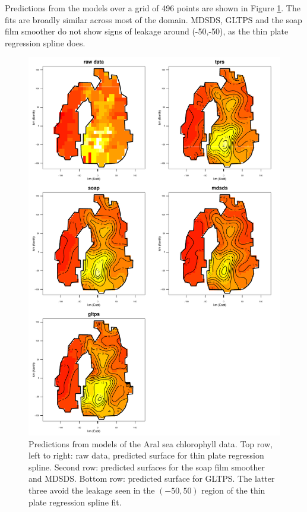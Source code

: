 \documentclass[smallextended]{svjour3}       %
\begin{document}
Predictions from the models over a grid of 496 points are shown in Figure \ref{aral-plot}. The fits are broadly similar across most of the domain. MDSDS, GLTPS and the soap film smoother do not show signs of leakage around (-50,-50), as the thin plate regression spline does.

\begin{figure}
\centering
\includegraphics[height=0.8\textheight]{examples/aral/aral-plot.pdf}
\caption{Predictions from models of the Aral sea chlorophyll data. Top row, left to right: raw data, predicted surface for thin plate regression spline. Second row: predicted surfaces for the soap film smoother and MDSDS. Bottom row: predicted surface for GLTPS. The latter three avoid the leakage seen in the $(-50, 50)$ region of the thin plate regression spline fit.}
\label{aral-plot}
\end{figure}
\end{document}
